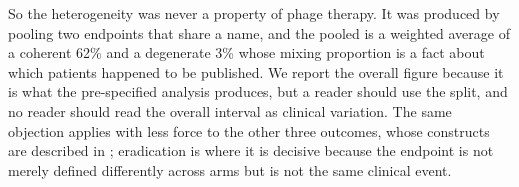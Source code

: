 So the heterogeneity was never a property of phage therapy. It was produced by pooling two endpoints that share a name, and the pooled \EradFullEst is a weighted average of a coherent 62\% and a degenerate 3\% whose mixing proportion is a fact about which patients happened to be published. We report the overall figure because it is what the pre-specified analysis produces, but a reader should use the split, and no reader should read the overall interval as clinical variation. The same objection applies with less force to the other three outcomes, whose constructs are described in ; eradication is where it is decisive because the endpoint is not merely defined differently across arms but is not the same clinical event.

\begin{table}[htbp]
\centering
\scriptsize
\setlength{\tabcolsep}{3pt}
\begin{threeparttable}
\caption{Pooled outcome-stratum cells meeting the pre-specified pooling threshold}
\label{tab:pooled-estimates}

\begin{tablenotes}
\small

\end{tablenotes}
\end{threeparttable}
\end{table}
